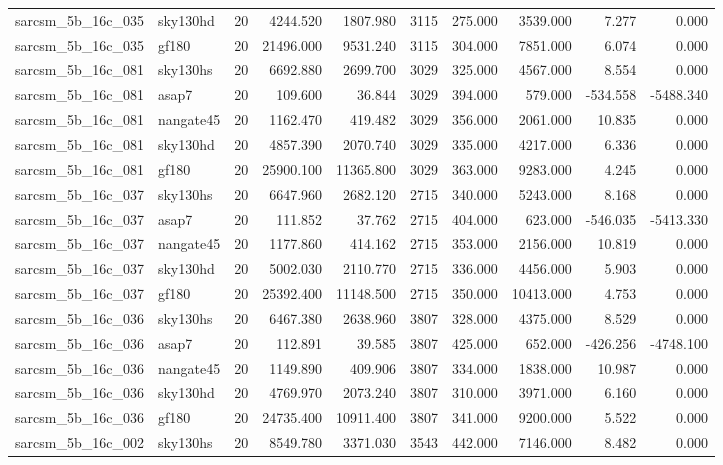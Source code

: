 \begin{longtable}{llrrrrrrrr}
sarcsm\_5b\_16c\_035 & sky130hd & 20 & 4244.520 & 1807.980 & 3115 & 275.000 & 3539.000 & 7.277 & 0.000 \\
sarcsm\_5b\_16c\_035 & gf180 & 20 & 21496.000 & 9531.240 & 3115 & 304.000 & 7851.000 & 6.074 & 0.000 \\
sarcsm\_5b\_16c\_081 & sky130hs & 20 & 6692.880 & 2699.700 & 3029 & 325.000 & 4567.000 & 8.554 & 0.000 \\
sarcsm\_5b\_16c\_081 & asap7 & 20 & 109.600 & 36.844 & 3029 & 394.000 & 579.000 & -534.558 & -5488.340 \\
sarcsm\_5b\_16c\_081 & nangate45 & 20 & 1162.470 & 419.482 & 3029 & 356.000 & 2061.000 & 10.835 & 0.000 \\
sarcsm\_5b\_16c\_081 & sky130hd & 20 & 4857.390 & 2070.740 & 3029 & 335.000 & 4217.000 & 6.336 & 0.000 \\
sarcsm\_5b\_16c\_081 & gf180 & 20 & 25900.100 & 11365.800 & 3029 & 363.000 & 9283.000 & 4.245 & 0.000 \\
sarcsm\_5b\_16c\_037 & sky130hs & 20 & 6647.960 & 2682.120 & 2715 & 340.000 & 5243.000 & 8.168 & 0.000 \\
sarcsm\_5b\_16c\_037 & asap7 & 20 & 111.852 & 37.762 & 2715 & 404.000 & 623.000 & -546.035 & -5413.330 \\
sarcsm\_5b\_16c\_037 & nangate45 & 20 & 1177.860 & 414.162 & 2715 & 353.000 & 2156.000 & 10.819 & 0.000 \\
sarcsm\_5b\_16c\_037 & sky130hd & 20 & 5002.030 & 2110.770 & 2715 & 336.000 & 4456.000 & 5.903 & 0.000 \\
sarcsm\_5b\_16c\_037 & gf180 & 20 & 25392.400 & 11148.500 & 2715 & 350.000 & 10413.000 & 4.753 & 0.000 \\
sarcsm\_5b\_16c\_036 & sky130hs & 20 & 6467.380 & 2638.960 & 3807 & 328.000 & 4375.000 & 8.529 & 0.000 \\
sarcsm\_5b\_16c\_036 & asap7 & 20 & 112.891 & 39.585 & 3807 & 425.000 & 652.000 & -426.256 & -4748.100 \\
sarcsm\_5b\_16c\_036 & nangate45 & 20 & 1149.890 & 409.906 & 3807 & 334.000 & 1838.000 & 10.987 & 0.000 \\
sarcsm\_5b\_16c\_036 & sky130hd & 20 & 4769.970 & 2073.240 & 3807 & 310.000 & 3971.000 & 6.160 & 0.000 \\
sarcsm\_5b\_16c\_036 & gf180 & 20 & 24735.400 & 10911.400 & 3807 & 341.000 & 9200.000 & 5.522 & 0.000 \\
sarcsm\_5b\_16c\_002 & sky130hs & 20 & 8549.780 & 3371.030 & 3543 & 442.000 & 7146.000 & 8.482 & 0.000 \\

\end{longtable}
